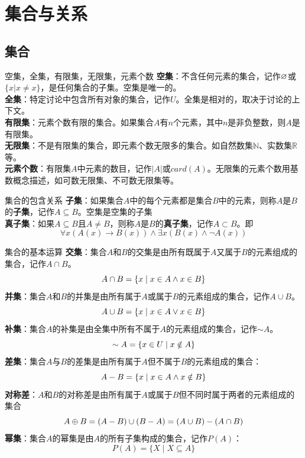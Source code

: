 \chapter{集合与关系}
\section{集合}
\begin{definition}{空集，全集，有限集，无限集，元素个数}{}
\textbf{空集}：不含任何元素的集合，记作$\varnothing$或$\{x|x\ne x\}$，是任何集合的子集。空集是唯一的。\\
\textbf{全集}：特定讨论中包含所有对象的集合，记作$U$。全集是相对的，取决于讨论的上下文。\\
\textbf{有限集}：元素个数有限的集合。如果集合$A$有$n$个元素，其中$n$是非负整数，则$A$是有限集。\\
\textbf{无限集}：不是有限集的集合，即元素个数无限多的集合。如自然数集$\mathbb{N}$、实数集$\mathbb{R}$等。\\
\textbf{元素个数}：有限集$A$中元素的数目，记作$|A|$或$card(A)$。无限集的元素个数用基数概念描述，如可数无限集、不可数无限集等。
\end{definition}
\begin{definition}{集合的包含关系}{}
    \textbf{子集}：如果集合$A$中的每个元素都是集合$B$中的元素，则称$A$是$B$的\textbf{子集}，记作$A \subseteq B$。空集是空集的子集\\
    \textbf{真子集}：如果$A \subseteq B$且$A \neq B$，则称$A$是$B$的\textbf{真子集}，记作$A \subset B$。即\vspace{-10pt}
    \[\forall x(A(x) \rightarrow B(x)) \land \exists x(B(x) \land \neg A(x))\]
\end{definition}
\begin{definition}{集合的基本运算}{}
\textbf{交集}：集合$A$和$B$的交集是由所有既属于$A$又属于$B$的元素组成的集合，记作$A \cap B$。\vspace{-10pt}
$$A \cap B = \{x \mid x \in A \land x \in B\}\vspace{-10pt}$$
\textbf{并集}：集合$A$和$B$的并集是由所有属于$A$或属于$B$的元素组成的集合，记作$A \cup B$。\vspace{-10pt}
$$A \cup B = \{x \mid x \in A \lor x \in B\}\vspace{-10pt}$$
\textbf{补集}：集合$A$的补集是由全集中所有不属于$A$的元素组成的集合，记作$\sim  A$。\vspace{-10pt}
$$\sim A = \{x \in U \mid x \notin A\}\vspace{-10pt}$$
\textbf{差集}：集合$A$与$B$的差集是由所有属于$A$但不属于$B$的元素组成的集合：\vspace{-10pt}
$$A-B = \{x \mid x \in A \land x \notin B\}\vspace{-10pt}$$
\textbf{对称差}：$A$和$B$的对称差是由所有属于$A$或属于$B$但不同时属于两者的元素组成的集合\vspace{-10pt}
$$A\oplus B = (A - B) \cup (B -A) = (A \cup B)- (A \cap B)\vspace{-10pt}$$
\textbf{幂集}：集合$A$的幂集是由$A$的所有子集构成的集合，记作$P(A)$：\vspace{-10pt}
$$P(A) = \{X \mid X \subseteq A\}$$
\end{definition}
